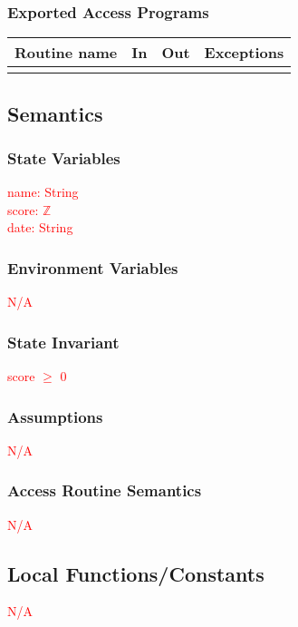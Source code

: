 \documentclass[12pt]{article}
\begin{document}
\subsubsection {Exported Access Programs}

\begin{tabular}{| l | l | l | l |}
\hline
\textbf{Routine name} & \textbf{In} & \textbf{Out} & \textbf{Exceptions}\\
\hline
& & & \\
\hline
\end{tabular}

\subsection {Semantics}

\subsubsection {State Variables}
\textcolor{red}{name: String}\\
\textcolor{red}{score: $\mathbb{Z}$}\\
\textcolor{red}{date: String}

\subsubsection {Environment Variables}
\textcolor{red}{N/A}

\subsubsection {State Invariant}
\textcolor{red}{score $\geq$ 0}

\subsubsection {Assumptions}
\textcolor{red}{N/A}

\subsubsection {Access Routine Semantics}
\textcolor{red}{N/A}

\subsection{Local Functions/Constants}
\textcolor{red}{N/A}

\medskip

\newpage
\end{document}
